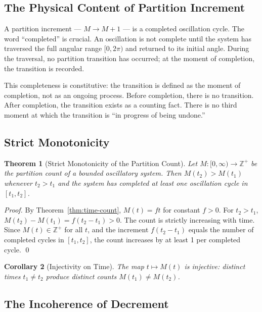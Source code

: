 \documentclass[twocolumn,10pt,a4paper]{article}
\theoremstyle{thmstyle}
\newtheorem{theorem}{Theorem}[section]
\newtheorem{corollary}[theorem]{Corollary}
\theoremstyle{definition}
\theoremstyle{remark}
\newcommand{\Zp}{\mathbb{Z}^{+}}
\begin{document}
\subsection{The Physical Content of Partition Increment}

A partition increment --- $M \to M + 1$ --- is a completed oscillation cycle. The word ``completed'' is crucial. An oscillation is not complete until the system has traversed the full angular range $[0, 2\pi)$ and returned to its initial angle. During the traversal, no partition transition has occurred; at the moment of completion, the transition is recorded.

This completeness is constitutive: the transition is defined as the moment of completion, not as an ongoing process. Before completion, there is no transition. After completion, the transition exists as a counting fact. There is no third moment at which the transition is ``in progress of being undone.''

\subsection{Strict Monotonicity}

\begin{theorem}[Strict Monotonicity of the Partition Count]
\label{thm:monotone}
Let $M : [0, \infty) \to \Zp$ be the partition count of a bounded oscillatory system. Then $M(t_2) > M(t_1)$ whenever $t_2 > t_1$ and the system has completed at least one oscillation cycle in $[t_1, t_2]$.
\end{theorem}

\begin{proof}
By Theorem~\ref{thm:time-count}, $M(t) = ft$ for constant $f > 0$. For $t_2 > t_1$, $M(t_2) - M(t_1) = f(t_2 - t_1) > 0$. The count is strictly increasing with time. Since $M(t) \in \Zp$ for all $t$, and the increment $f(t_2 - t_1)$ equals the number of completed cycles in $[t_1, t_2]$, the count increases by at least 1 per completed cycle. \qed
\end{proof}

\begin{corollary}[Injectivity on Time]
\label{cor:inject-time}
The map $t \mapsto M(t)$ is injective: distinct times $t_1 \neq t_2$ produce distinct counts $M(t_1) \neq M(t_2)$.
\end{corollary}

\subsection{The Incoherence of Decrement}
\end{document}
